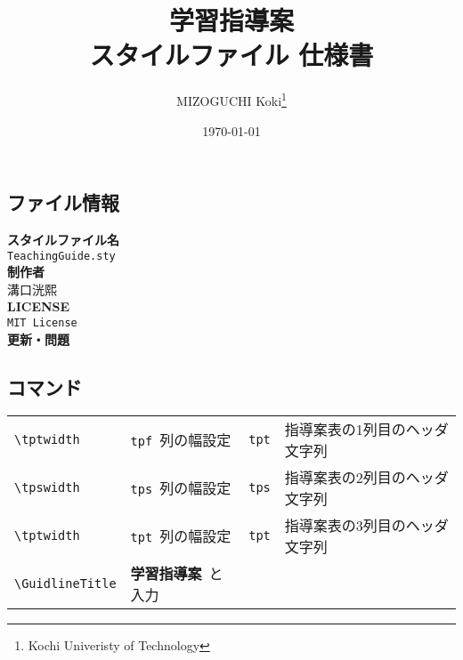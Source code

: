 \documentclass[paper=a4,fontsize=10.5pt]{jlreq}
\title{\textbf{学習指導案}\\ \LaTeXe スタイルファイル 仕様書}
\author{MIZOGUCHI Koki\thanks{Kochi Univeristy of Technology}}
\date{\today}
\begin{document}
\maketitle
\begin{leftbar}
    \section*{ファイル情報}
\end{leftbar}
\begin{framed}
    \begin{multicols}{2}
        \noindent\textbf{スタイルファイル名}\\
        \hspace{0.5em}\verb|TeachingGuide.sty|\\
        \textbf{制作者}\\
        \hspace{0.5em}溝口洸熙\\
        \newline
        \textbf{LICENSE}\\
        \hspace{0.5em}\verb|MIT License|\\
        \textbf{更新・問題}\\
    \end{multicols}
\end{framed}
\begin{leftbar}
    \section*{コマンド}
\end{leftbar}
\begin{table}[h]
    \begin{tabular}{ll|ll}
        \verb|\tptwidth|      & \verb|tpf|\ 列の幅設定      & \verb|tpt| & 指導案表の1列目のヘッダ文字列 \\
        \verb|\tpswidth|      & \verb|tps|\ 列の幅設定      & \verb|tps| & 指導案表の2列目のヘッダ文字列 \\
        \verb|\tptwidth|      & \verb|tpt|\ 列の幅設定      & \verb|tpt| & 指導案表の3列目のヘッダ文字列 \\
        \verb|\GuidlineTitle| & \textbf{学習指導案}\ と入力
    \end{tabular}
\end{table}
\end{document}
